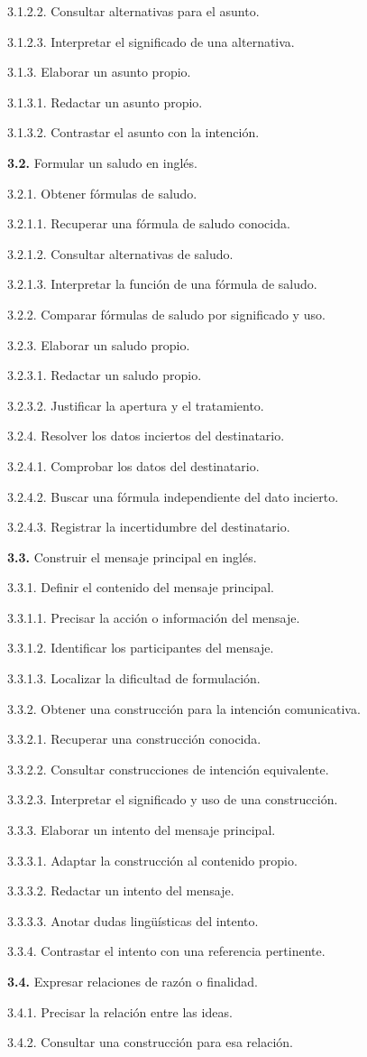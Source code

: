 \documentclass[10pt,a4paper]{article}
\newcommand{\HTAline}[3]{\par\noindent\hspace*{#1cm}\begin{minipage}{\dimexpr\linewidth-#1cm\relax}#3 #2\end{minipage}\par}
\begin{document}
\HTAline{1.2000000000000002}{3.1.2.2. Consultar alternativas para el asunto.}{}
\HTAline{1.2000000000000002}{3.1.2.3. Interpretar el significado de una alternativa.}{}
\HTAline{0.8}{3.1.3. Elaborar un asunto propio.}{}
\HTAline{1.2000000000000002}{3.1.3.1. Redactar un asunto propio.}{}
\HTAline{1.2000000000000002}{3.1.3.2. Contrastar el asunto con la intención.}{}
\HTAline{0.4}{\textbf{3.2.} Formular un saludo en inglés.}{}
\HTAline{0.8}{3.2.1. Obtener fórmulas de saludo.}{}
\HTAline{1.2000000000000002}{3.2.1.1. Recuperar una fórmula de saludo conocida.}{}
\HTAline{1.2000000000000002}{3.2.1.2. Consultar alternativas de saludo.}{}
\HTAline{1.2000000000000002}{3.2.1.3. Interpretar la función de una fórmula de saludo.}{}
\HTAline{0.8}{3.2.2. Comparar fórmulas de saludo por significado y uso.}{}
\HTAline{0.8}{3.2.3. Elaborar un saludo propio.}{}
\HTAline{1.2000000000000002}{3.2.3.1. Redactar un saludo propio.}{}
\HTAline{1.2000000000000002}{3.2.3.2. Justificar la apertura y el tratamiento.}{}
\HTAline{0.8}{3.2.4. Resolver los datos inciertos del destinatario.}{}
\HTAline{1.2000000000000002}{3.2.4.1. Comprobar los datos del destinatario.}{}
\HTAline{1.2000000000000002}{3.2.4.2. Buscar una fórmula independiente del dato incierto.}{}
\HTAline{1.2000000000000002}{3.2.4.3. Registrar la incertidumbre del destinatario.}{}
\HTAline{0.4}{\textbf{3.3.} Construir el mensaje principal en inglés.}{}
\HTAline{0.8}{3.3.1. Definir el contenido del mensaje principal.}{}
\HTAline{1.2000000000000002}{3.3.1.1. Precisar la acción o información del mensaje.}{}
\HTAline{1.2000000000000002}{3.3.1.2. Identificar los participantes del mensaje.}{}
\HTAline{1.2000000000000002}{3.3.1.3. Localizar la dificultad de formulación.}{}
\HTAline{0.8}{3.3.2. Obtener una construcción para la intención comunicativa.}{}
\HTAline{1.2000000000000002}{3.3.2.1. Recuperar una construcción conocida.}{}
\HTAline{1.2000000000000002}{3.3.2.2. Consultar construcciones de intención equivalente.}{}
\HTAline{1.2000000000000002}{3.3.2.3. Interpretar el significado y uso de una construcción.}{}
\HTAline{0.8}{3.3.3. Elaborar un intento del mensaje principal.}{}
\HTAline{1.2000000000000002}{3.3.3.1. Adaptar la construcción al contenido propio.}{}
\HTAline{1.2000000000000002}{3.3.3.2. Redactar un intento del mensaje.}{}
\HTAline{1.2000000000000002}{3.3.3.3. Anotar dudas lingüísticas del intento.}{}
\HTAline{0.8}{3.3.4. Contrastar el intento con una referencia pertinente.}{}
\HTAline{0.4}{\textbf{3.4.} Expresar relaciones de razón o finalidad.}{}
\HTAline{0.8}{3.4.1. Precisar la relación entre las ideas.}{}
\HTAline{0.8}{3.4.2. Consultar una construcción para esa relación.}{}
\end{document}
